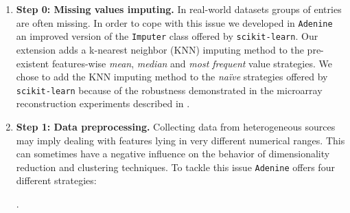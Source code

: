 \documentclass[twoside,11pt]{article}
\makeatletter
\newcommand{\ade}{\texttt{Adenine}\@\xspace}
\makeatother
\begin{document}
\begin{enumerate}[leftmargin=*]
\item[]{\bf Step 0: Missing values imputing.}
  In real-world datasets groups of entries are often missing. In order to cope with this issue we developed in \ade an improved version of the \texttt{Imputer} class offered by \texttt{scikit-learn}. Our extension adds a k-nearest neighbor (KNN) imputing method to the pre-existent features-wise \emph{mean}, \emph{median} and \emph{most frequent} value strategies.
  We chose to add the KNN imputing method to the \emph{na\"ive} strategies offered by \texttt{scikit-learn} because of the robustness demonstrated in the microarray reconstruction experiments described in \citep{troyanskaya2001missing}.

  \item[]{\bf Step 1: Data preprocessing.}
  Collecting data from heterogeneous sources may imply dealing with features lying in very different numerical ranges. This can sometimes have a negative influence on the behavior of dimensionality reduction and clustering techniques. To tackle this issue \ade offers four different strategies:
  .


\end{enumerate}
\end{document}
